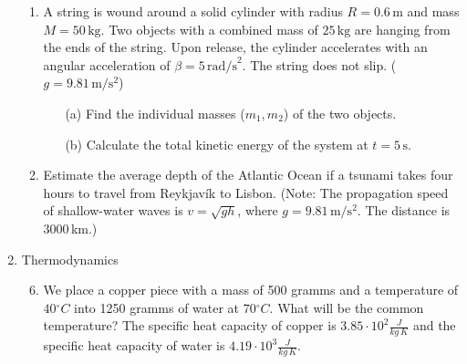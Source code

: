 \documentclass[a4paper,12pt]{letter}
\begin{document}
\begin{enumerate}[label=\Roman*.]
\begin{enumerate}[label=\arabic*.]

\item A string is wound around a solid cylinder with radius $R = 0.6\,\text{m}$ and mass $M = 50\,\text{kg}$. Two objects with a combined mass of $25\,\text{kg}$ are hanging from the ends of the string. Upon release, the cylinder accelerates with an angular acceleration of $\beta = 5\,\text{rad/s}^2$. The string does not slip. ($g=9.81\,\mathrm{m/s^{2}}$)     
\begin{itemize}
    \item[(a)] Find the individual masses ($m_1, m_2$) of the two objects.
    \item[(b)] Calculate the total kinetic energy of the system at $t = 5\,\text{s}$.
\end{itemize}


\item Estimate the average depth of the Atlantic Ocean if a tsunami takes four hours to travel from Reykjavík to Lisbon. (Note: The propagation speed of shallow-water waves is $v=\sqrt{gh}$, where $g=9.81\,\mathrm{m/s^{2}}$. The distance is $3000$\,km.)

\end{enumerate}


\item Thermodynamics

\begin{enumerate}[label=\arabic*.]
\setcounter{enumii}{5} %


\item We place a copper piece with a mass of 500 gramms and a temperature of $40{}^{\circ}C$ into 1250 gramms of water at $70{}^{\circ}C$. What will be the common temperature? The specific heat capacity of copper is $3.85 \cdot 10^{2}\frac{J}{kg\,K}$ and the specific heat capacity of water is $4.19 \cdot 10^{3}\frac{J}{kg\,K}$.


\end{enumerate}
\end{enumerate}
\end{document}
